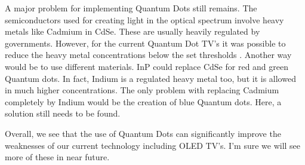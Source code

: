 \documentclass[11pt,a4paper]{article} %
\begin{document}
\begin{multicols}{2}





    A major problem for implementing Quantum Dots still remains. The
    semiconductors used for creating light in the optical spectrum involve heavy
    metals like Cadmium in CdSe. These are usually heavily regulated by
    governments. However, for the current Quantum Dot TV’s it was possible to
    reduce the heavy metal concentrations below the set thresholds \cite{Shu2020}. Another
    way would be to use different materials. InP could replace CdSe for red and
    green Quantum dots. In fact, Indium is a regulated heavy metal too, but it is
    allowed in much higher concentrations. The only problem with replacing Cadmium
    completely by Indium would be the creation of blue Quantum dots. Here, a
    solution still needs to be found.

    Overall, we see that the use of Quantum Dots can significantly improve the
    weaknesses of our current technology including OLED TV’s. I’m sure we will see
    more of these in near future.



\end{multicols}
\end{document}

